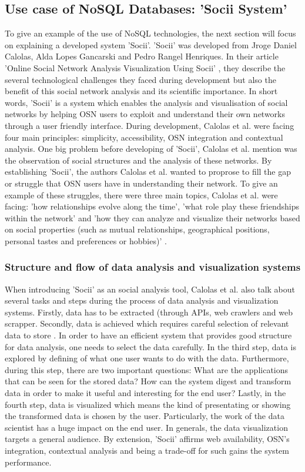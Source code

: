 \subsection{Use case of NoSQL Databases: 'Socii System'}

To give an example of the use of NoSQL technologies, the next section will focus on explaining a developed system 'Socii'. 'Socii' was developed from Jroge Daniel Calolas, Alda Lopes Gancarski and Pedro Rangel Henriques. In their article 'Online Social Network Analysis Visualization Using Socii' \cite[p.218-228]{trends_nosql}, they describe the several technological challenges they faced during development but also the benefit of this social network analysis and its scientific importance. In short words, 'Socii' is a system which enables the analysis and visualisation of social networks by helping \ac{OSN} users to exploit and understand their own networks through a user friendly interface. During development, Calolas et al. were facing four main principles: simplicity, accessibility, OSN integration and contextual analysis.
One big problem before developing of 'Socii', Calolas et al. mention was the observation of social structures and the analysis of these networks. By establishing 'Socii', the authors Calolas et al. wanted to proprose to fill the gap or struggle that OSN users have in understanding their network. To give an example of these struggles, there were three main topics, Calolas et al. were facing: 'how relationships evolve along the time', 'what role play these friendships within the network' and 'how they can analyze and visualize their networks based on social properties (such as mutual relationships, geographical positions, personal tastes and preferences or hobbies)' \cite{trends_nosql}. 

\subsubsection{Structure and flow of data analysis and visualization systems}

When introducing 'Socii' as an social analysis tool, Calolas et al. also talk about several tasks and steps during the process of data analysis and visualization systems. Firstly, data has to be extracted (through APIs, web crawlers and web scrapper. Secondly, data is achieved which requires careful selection of relevant data to store \cite{trends_nosql}. In order to have an efficient system that provides good structure for data analysis, one needs to select the data carefully. In the third step, data is explored by defining of what one user wants to do with the data. Furthermore, during this step, there are two important questions: What are the applications that can be seen for the stored data? How can the system digest and transform data in order to make it useful and interesting for the end user? 
Lastly, in the fourth step, data is visualized which means the kind of presentating or showing the transformed data is chosen by the user. Particularly, the work of the data scientist has a huge impact on the end user. In generals, the data visualization targets a general audience.  
By extension, 'Socii' affirms web availability, OSN's  integration, contextual analysis and being a trade-off for such gains the system performance.

